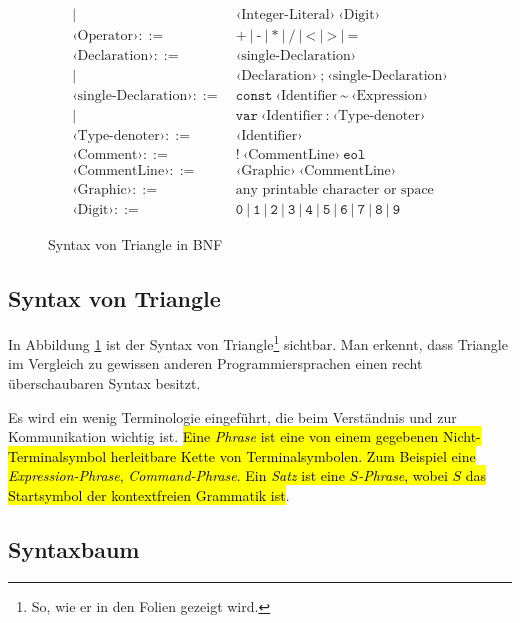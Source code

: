 \documentclass[
  ngerman,
  DIV=12
]{scrartcl}
\begin{document}
\begin{figure}
\begin{align*}
  |&\ ‹\textrm{Integer-Literal}›\ ‹\textrm{Digit}›\\
‹\textrm{Operator}› ::=&\ \texttt{+}\ |\ \texttt{-}\ |\ \texttt{*}\ |\ \texttt{/}\ |\ \texttt{<}\ |\ \texttt{>}\ |\ \texttt{=}\\
‹\textrm{Declaration}› ::=&\ ‹\textrm{single-Declaration}›\\
  |&\ ‹\textrm{Declaration}›\ \texttt{;}\ ‹\textrm{single-Declaration}›\\
‹\textrm{single-Declaration}› ::=&\ \texttt{const}\ ‹\textrm{Identifier}\ \texttt{\textasciitilde}\ ‹\textrm{Expression}›\\
  |&\ \texttt{var}\ ‹\textrm{Identifier}\ \texttt{:}\ ‹\textrm{Type-denoter}›\\
‹\textrm{Type-denoter}› ::=&\ ‹\textrm{Identifier}›\\
‹\textrm{Comment}› ::=&\ \texttt{!}\ ‹\textrm{CommentLine}›\ \texttt{eol}\\
‹\textrm{CommentLine}› ::=&\ ‹\textrm{Graphic}›\ ‹\textrm{CommentLine}›\\
‹\textrm{Graphic}› ::=&\ \text{any printable character or space}\\
‹\textrm{Digit}› ::=&\ \texttt{0}\ |\ \texttt{1}\ |\ \texttt{2}\ |\ \texttt{3}\ |\ \texttt{4}\ |\ \texttt{5}\ |\ \texttt{6}\ |\ \texttt{7}\ |\ \texttt{8}\ |\ \texttt{9}
\end{align*}
\caption{Syntax von Triangle in BNF}\label{fig:trianglesyntax}
\end{figure}

\subsection{Syntax von Triangle}

In Abbildung \ref{fig:trianglesyntax} ist der Syntax von Triangle\footnote{So, wie er in den Folien gezeigt wird.} sichtbar. Man erkennt, dass Triangle im Vergleich zu gewissen anderen Programmiersprachen einen recht überschaubaren Syntax besitzt. 

Es wird ein wenig Terminologie eingeführt, die beim Verständnis und zur Kommunikation wichtig ist. \hl{Eine \emph{Phrase} ist eine von einem gegebenen Nicht-Terminalsymbol herleitbare Kette von Terminalsymbolen. Zum Beispiel eine \emph{Expression-Phrase}, \emph{Command-Phrase}. Ein \emph{Satz} ist eine \emph{$S$-Phrase}, wobei $S$ das Startsymbol der kontextfreien Grammatik ist}.

\subsection{Syntaxbaum}
\end{document}
